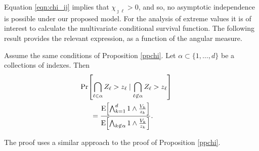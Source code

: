 Equation \ref{eqn:chi_ij} implies that $\chi_{\jmath\ell}>0$, and so, no asymptotic independence is possible under our proposed model. For the analysis of extreme values it is of interest to calculate the multivariate conditional survival function. The following result provides the relevant expression, as a function of the angular measure.
\begin{prop}
Assume the same conditions of Proposition \ref{ppchi}. 
Let $\alpha \subset \{1, \ldots ,d\}$ be a collections of indexes. 
Then     
\begin{equation} \label{eqn:condsurv}
    \begin{aligned}
    &\hspace{-0.5cm}\mathrm{Pr}\left[\bigcap_{\ell \in \alpha} Z_\ell > z_\ell \mid \bigcap_{\ell\not\in\alpha} Z_\ell > z_\ell\right] \\
    &= \frac{\expect{\bigwedge_{k = 1}^d 1\wedge \frac{V_k}{z_k}}}{\expect{\bigwedge_{k \not\in\alpha}1\wedge\frac{V_k}{z_k}}}.
    \end{aligned}
  \end{equation}
\end{prop}  
The proof uses a similar approach to the proof of Proposition \ref{ppchi}.

